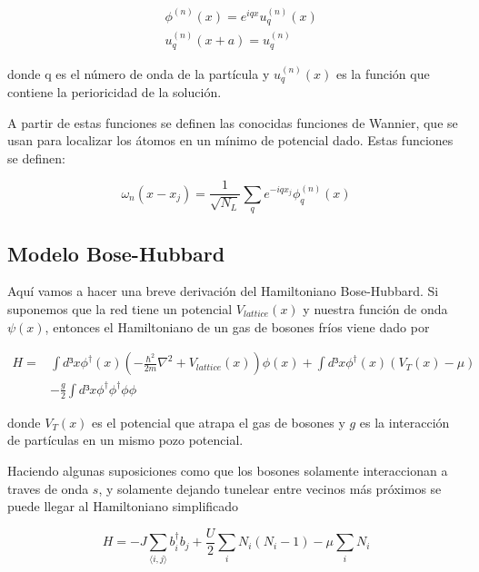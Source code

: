 \documentclass[11pt,a4paper]{article}
\begin{document}
\begin{equation}
  \begin{split}
    & \phi^{(n)}(x)=\textit{e}^{iqx}u_q^{(n)}(x) \\
    & u_q^{(n)}(x+a)=u_q^{(n)}
  \end{split}
\end{equation}

donde q es el número de onda de la partícula y $u_q^{(n)}(x)$ es la función que contiene la perioricidad de la solución.



A partir de estas funciones se definen las conocidas funciones de Wannier, que se usan para localizar los átomos en un mínimo de potencial dado. Estas funciones se definen:

\begin{equation}
  \omega_n(x-x_j)=\frac{1}{\sqrt{N_L}}\sum_q\textit{e}^{-iqx_j}\phi_q^{(n)}(x)
\end{equation}


\subsection{Modelo Bose-Hubbard}

Aquí vamos a hacer una breve derivación del Hamiltoniano Bose-Hubbard. Si suponemos que la red tiene un potencial $V_{lattice}(x)$ y nuestra función de onda $\psi(x)$, entonces el Hamiltoniano de un gas de bosones fríos viene dado por

\begin{equation}
  \begin{split}
    H = & \int d³x \phi^{\dagger}(x)(-\frac{\hbar^2}{2m}\nabla^2+V_{lattice}(x))\phi(x)+\int d³x\phi^{\dagger}(x)(V_T(x)-\mu) \\
    &-\frac{g}{2}\int d³x\phi^{\dagger}\phi^{\dagger}\phi\phi
  \end{split}
\end{equation}

donde $V_T(x)$ es el potencial que atrapa el gas de bosones y $g$ es la interacción de partículas en un mismo pozo potencial.



Haciendo algunas suposiciones como que los bosones solamente interaccionan a traves de onda $s$, y solamente dejando tunelear entre vecinos más próximos se puede llegar al Hamiltoniano simplificado


\begin{equation}
  H=-J\sum_{\langle i,j\rangle}b_i^{\dagger}b_j+\frac{U}{2}\sum_iN_i(N_i-1)-\mu\sum_iN_i
\end{equation}
\end{document}
